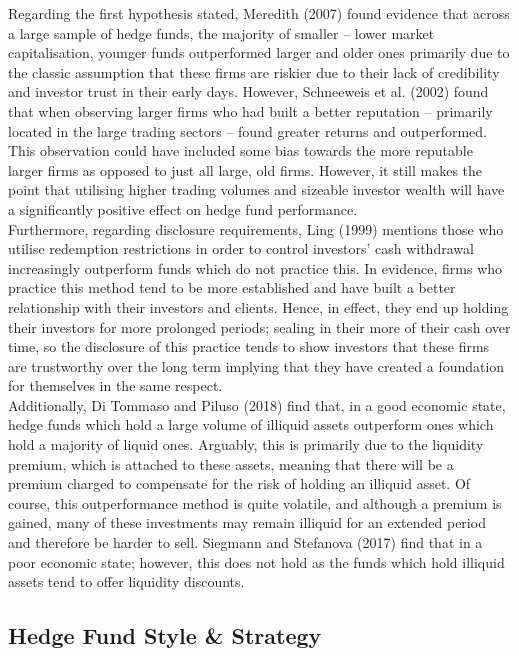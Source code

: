 \documentclass[11pt, english]{article}
\begin{document}
	Regarding the first hypothesis stated, Meredith (2007) found evidence that across a large sample of hedge funds, the majority of smaller – lower market capitalisation, younger funds outperformed larger and older ones primarily due to the classic assumption that these firms are riskier due to their lack of credibility and investor trust in their early days. However, Schneeweis et al. (2002) found that when observing larger firms who had built a better reputation – primarily located in the large trading sectors – found greater returns and outperformed. This observation could have included some bias towards the more reputable larger firms as opposed to just all large, old firms. However, it still makes the point that utilising higher trading volumes and sizeable investor wealth will have a significantly positive effect on hedge fund performance.\\

	Furthermore, regarding disclosure requirements, Ling (1999) mentions those who utilise redemption restrictions in order to control investors’ cash withdrawal increasingly outperform funds which do not practice this. In evidence, firms who practice this method tend to be more established and have built a better relationship with their investors and clients. Hence, in effect, they end up holding their investors for more prolonged periods; sealing in their more of their cash over time, so the disclosure of this practice tends to show investors that these firms are trustworthy over the long term implying that they have created a foundation for themselves in the same respect.\\

	Additionally, Di Tommaso and Piluso (2018) find that, in a good economic state, hedge funds which hold a large volume of illiquid assets outperform ones which hold a majority of liquid ones. Arguably, this is primarily due to the liquidity premium, which is attached to these assets, meaning that there will be a premium charged to compensate for the risk of holding an illiquid asset. Of course, this outperformance method is quite volatile, and although a premium is gained, many of these investments may remain illiquid for an extended period and therefore be harder to sell. Siegmann and Stefanova (2017) find that in a poor economic state; however, this does not hold as the funds which hold illiquid assets tend to offer liquidity discounts.

	\subsection{Hedge Fund Style \& Strategy}
\end{document}
